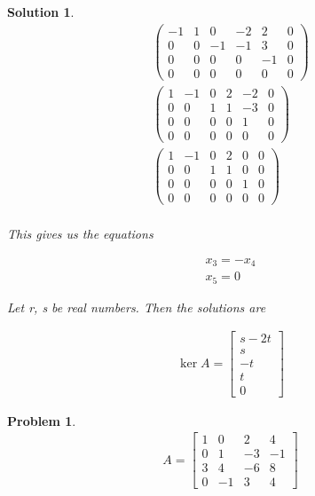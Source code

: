 \documentclass{article}
\newtheorem{problem}{Problem}
\newtheorem*{solution}{Solution}
\begin{document}
\begin{solution}
\begin{align*}
\left( \begin{array}{ccccc|c} -1 & 1 & 0 & -2 & 2 & 0 \\ 0 & 0 & -1 & -1 & 3 & 0 \\ 0 & 0 & 0 & 0 & -1 & 0 \\ 0 & 0 & 0 & 0 & 0 & 0 \end{array} \right) \\
\left( \begin{array}{ccccc|c} 1 & -1 & 0 & 2 & -2 & 0 \\ 0 & 0 & 1 & 1 & -3 & 0 \\ 0 & 0 & 0 & 0 & 1 & 0 \\ 0 & 0 & 0 & 0 & 0 & 0 \end{array} \right) \\
\left( \begin{array}{ccccc|c} 1 & -1 & 0 & 2 & 0 & 0 \\ 0 & 0 & 1 & 1 & 0 & 0 \\ 0 & 0 & 0 & 0 & 1 & 0 \\ 0 & 0 & 0 & 0 & 0 & 0 \end{array} \right) \\
\end{align*}

This gives us the equations

\begin{align*}
x_{3} = -x_{4} \\
x_{5} = 0
\end{align*}

Let r, s be real numbers. Then the solutions are

\begin{align*}
\ker A = \begin{bmatrix}
s - 2t \\ s \\ -t \\ t \\ 0
\end{bmatrix}
\end{align*}

\end{solution}

\begin{problem}
\begin{align*}
A = \begin{bmatrix}1 & 0 & 2 & 4 \\ 0 & 1 & -3 & -1 \\ 3 & 4 & -6 & 8 \\ 0 & -1 & 3 & 4 \end{bmatrix}
\end{align*}
\end{problem}
\end{document}
